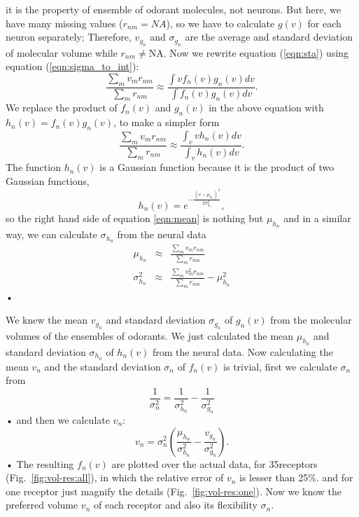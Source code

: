 \documentclass[11pt]{paper} %
\newcommand{\numberofreceptors}{35}
\begin{document}
it is the property of ensemble of odorant molecules, not neurons. 
But here, we have many missing values ($r_{nm} = NA$), 
so we have to calculate $g(v)$ for each neuron separately; 
Therefore, $v_{g_n}$ and $\sigma_{g_n}$ are the average and standard deviation of molecular volume while $r_{nm} \neq \text{NA}$.
Now we rewrite equation (\ref{eqn:sta}) using equation (\ref{eqn:sigma_to_int}):
\begin{equation}
	\frac{\displaystyle \sum_{m} v_m r_{nm}}{\displaystyle \sum_{m} r_{nm}} \approx \frac{\displaystyle \int v f_n(v) g_n(v) dv}{\displaystyle \int f_n(v) g_n(v) dv}.
	\label{eqn:sta_int}
\end{equation}
We replace the product of $f_n(v)$ and $g_n(v)$ in the above equation with $h_n(v) = f_n(v) g_n(v)$, to make a simpler form
\begin{equation}
	\frac{\displaystyle \sum_{m} v_m r_{nm}}{\displaystyle \sum_{m} r_{nm}} \approx \frac{\displaystyle \int_v v h_n(v) dv}{ \displaystyle \int_v  h_n(v) dv }.
	\label{eqn:mean}
\end{equation}
The function $h_n(v)$ is a Gaussian function because it is the product of two Gaussian functions, 
\begin{equation}
h_n(v) = e^{-\frac{(v-\mu_{h_n})^2}{2\sigma_{h_n}^2}}, 
\end{equation}
so the right hand side of equation \ref{eqn:mean} is nothing but $\mu_{h_n}$ and 
in a similar way, we can calculate $\sigma_{h_n}$ from the neural data
\begin{eqnarray}
	\mu_{h_n} &\approx& \frac{\displaystyle \sum_{m} v_m r_{nm}}{\displaystyle \sum_{m} r_{nm}} \\
	\sigma_{h_n}^2 &\approx& \frac{\displaystyle \sum_{m} v_m^2 r_{nm}}{\displaystyle \sum_{m} r_{nm}} - \mu_{h_n}^2
	\label{eqn:final_h}
\end{eqnarray}•


We knew the mean $v_{g_n}$ and standard deviation $\sigma_{g_n}$ of $g_n(v)$ from the molecular volumes of the ensembles of odorants. 
We just calculated the mean $\mu_{h_n}$ and standard deviation $\sigma_{h_n}$ of $h_n(v)$ from the neural data.
Now calculating the mean $v_n$ and the standard deviation $\sigma_n$ of $f_n(v)$ is trivial,
first we calculate $\sigma_n$ from 
\begin{equation}
	\frac{1}{\sigma_n^2} = \frac{1}{\sigma^2_{h_n}}  - \frac{1}{\sigma^2_{g_n}}
\end{equation}•
and then we calculate $v_n$: 
\begin{equation}
	v_n =  \sigma_n^2 \left ( \frac{\mu_{h_n}}{\sigma^2_{h_n}} - \frac{v_{g_n}}{\sigma^2_{g_n}} \right ).
\end{equation}•
The resulting $f_n(v)$ are plotted over the actual data, for \numberofreceptors receptors (Fig.~\ref{fig:vol-res:all}), 
in which the relative error of $v_n$ is lesser than 25\%.	
and for one receptor just magnify the details (Fig.~\ref{fig:vol-res:one}).
Now we know the preferred volume $v_n$ of each receptor and also its flexibility $\sigma_n$.
\end{document}
